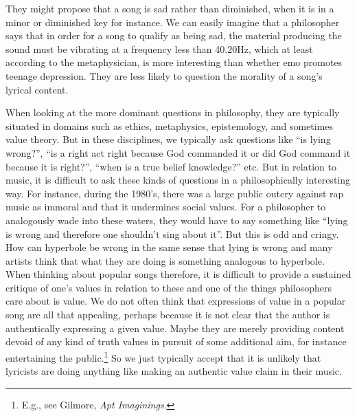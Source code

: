 \documentclass[phdthesis,12pt,final,a4paper]{wuthesis}
\theoremstyle{definition}
\theoremstyle{definition}
\theoremstyle{definition}
\theoremstyle{definition}
\theoremstyle{remark}
\begin{document}
They might propose that a song is sad rather than diminished, when it is in a minor or diminished key for instance. We can easily imagine that a philosopher says that in order for a song to qualify as being sad, the material producing the sound must be vibrating at a frequency less than 40.20Hz, which at least according to the metaphysician, is more interesting than whether emo promotes teenage depression. They are less likely to question the morality of a song's lyrical content.

When looking at the more dominant questions in philosophy, they are typically situated in domains such as ethics, metaphysics, epistemology, and sometimes value theory. But in these disciplines, we typically ask questions like ``is lying wrong?'', ``is a right act right because God commanded it or did God command it because it is right?'', ``when is a true belief knowledge?'' etc. But in relation to music, it is difficult to ask these kinds of questions in a philosophically interesting way. For instance, during the 1980's, there was a large public outcry against rap music as immoral and that it undermines social values. For a philosopher to analogously wade into these waters, they would have to say something like ``lying is wrong and therefore one shouldn't sing about it''. But this is odd and cringy. How can hyperbole be wrong in the same sense that lying is wrong and many artists think that what they are doing is something analogous to hyperbole. When thinking about popular songs therefore, it is difficult to provide a sustained critique of one's values in relation to these and one of the things philosophers care about is value. We do not often think that expressions of value in a popular song are all that appealing, perhaps because it is not clear that the author is authentically expressing a given value. Maybe they are merely providing content devoid of any kind of truth values in pursuit of some additional aim, for instance entertaining the public.\footnote{E.g., see Gilmore, \emph{Apt {Imaginings}}.} So we just typically accept that it is unlikely that lyricists are doing anything like making an authentic value claim in their music.
\end{document}

